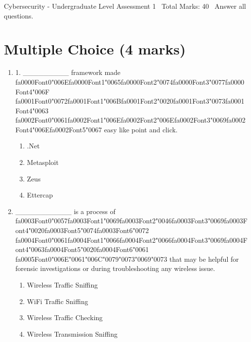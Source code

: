 \documentclass[12pt]{article}
\begin{document}
\begin{center}
Cybersecurity - Undergraduate Level Assessment 1 \
Total Marks: 40 \
Answer all questions.
\end{center}

\section*{Multiple Choice (4 marks)}
\begin{enumerate}[label=\arabic*.]
\item 1. \_\_\_\_\_\_\_\_\_ framework made {\csname fa0000Font0\endcsname\char"006E}{\csname fa0000Font1\endcsname\char"0065}{\csname fa0000Font2\endcsname\char"0074}{\csname fa0000Font3\endcsname\char"0077}{\csname fa0000Font4\endcsname\char"006F} {\csname fa0001Font0\endcsname\char"0072}{\csname fa0001Font1\endcsname\char"006B}{\csname fa0001Font2\endcsname\char"0020}{\csname fa0001Font3\endcsname\char"0073}{\csname fa0001Font4\endcsname\char"0063} {\csname fa0002Font0\endcsname\char"0061}{\csname fa0002Font1\endcsname\char"006E}{\csname fa0002Font2\endcsname\char"006E}{\csname fa0002Font3\endcsname\char"0069}{\csname fa0002Font4\endcsname\char"006E}{\csname fa0002Font5\endcsname\char"0067} easy like point and click.
\begin{enumerate}[label=(\alph*)]
    \item .Net
    \item Metasploit
    \item Zeus
    \item Ettercap
\end{enumerate}
\item \_\_\_\_\_\_\_\_\_\_\_ is a process of {\csname fa0003Font0\endcsname\char"0057}{\csname fa0003Font1\endcsname\char"0069}{\csname fa0003Font2\endcsname\char"0046}{\csname fa0003Font3\endcsname\char"0069}{\csname fa0003Font4\endcsname\char"0020}{\csname fa0003Font5\endcsname\char"0074}{\csname fa0003Font6\endcsname\char"0072} {\csname fa0004Font0\endcsname\char"0061}{\csname fa0004Font1\endcsname\char"0066}{\csname fa0004Font2\endcsname\char"0066}{\csname fa0004Font3\endcsname\char"0069}{\csname fa0004Font4\endcsname\char"0063}{\csname fa0004Font5\endcsname\char"0020}{\csname fa0004Font6\endcsname\char"0061} {\csname fa0005Font0\endcsname\char"006E}{\char"0061}{\char"006C}{\char"0079}{\char"0073}{\char"0069}{\char"0073} that may be helpful for forensic investigations or during troubleshooting any wireless issue.
\begin{enumerate}[label=(\alph*)]
    \item Wireless Traffic Sniffing
    \item WiFi Traffic Sniffing
    \item Wireless Traffic Checking
    \item Wireless Transmission Sniffing
\end{enumerate}
\end{enumerate}
\end{document}
